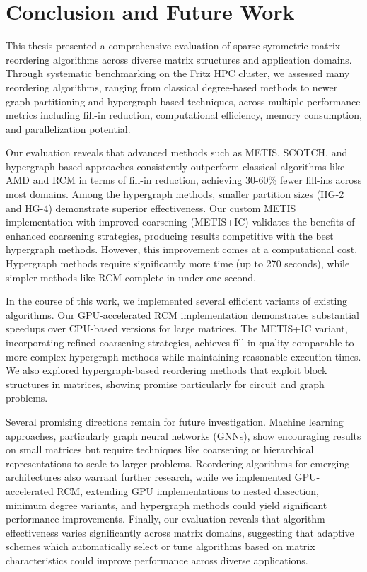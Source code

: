 \chapter{Conclusion and Future Work}
\label{ch:conclusion}

This thesis presented a comprehensive evaluation of sparse symmetric matrix reordering algorithms across diverse matrix structures and application domains. Through systematic benchmarking on the Fritz HPC cluster, we assessed many reordering algorithms, ranging from classical degree-based methods to newer graph partitioning and hypergraph-based techniques, across multiple performance metrics including fill-in reduction, computational efficiency, memory consumption, and parallelization potential.

Our evaluation reveals that advanced methods such as METIS, SCOTCH, and hypergraph based approaches consistently outperform classical algorithms like AMD and RCM in terms of fill-in reduction, achieving 30-60\% fewer fill-ins across most domains. Among the hypergraph methods, smaller partition sizes (HG-2 and HG-4) demonstrate superior effectiveness. Our custom METIS implementation with improved coarsening (METIS+IC) validates the benefits of enhanced coarsening strategies, producing results competitive with the best hypergraph methods. However, this improvement comes at a computational cost. Hypergraph methods require significantly more time (up to 270 seconds), while simpler methods like RCM complete in under one second.

In the course of this work, we implemented several efficient variants of existing algorithms. Our GPU-accelerated RCM implementation demonstrates substantial speedups over CPU-based versions for large matrices. The METIS+IC variant, incorporating refined coarsening strategies, achieves fill-in quality comparable to more complex hypergraph methods while maintaining reasonable execution times. We also explored hypergraph-based reordering methods that exploit block structures in matrices, showing promise particularly for circuit and graph problems.


Several promising directions remain for future investigation. Machine learning approaches, particularly graph neural networks (GNNs), show encouraging results on small matrices but require techniques like coarsening or hierarchical representations to scale to larger problems. Reordering algorithms for emerging architectures also warrant further research, while we implemented GPU-accelerated RCM, extending GPU implementations to nested dissection, minimum degree variants, and hypergraph methods could yield significant performance improvements. Finally, our evaluation reveals that algorithm effectiveness varies significantly across matrix domains, suggesting that adaptive schemes which automatically select or tune algorithms based on matrix characteristics could improve performance across diverse applications.
